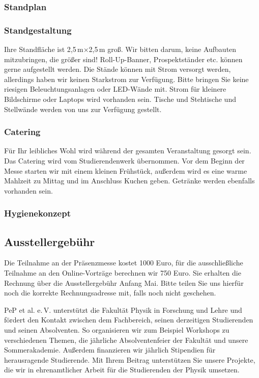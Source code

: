 \documentclass[
  paper=a4,
  fontsize=12pt,
  DIV=16,
  headheight=30pt,
  footheight=45pt,
  headinclude,
  parskip=half,
]{scrartcl}
\begin{document}
\subsubsection*{Standplan}
\subsubsection*{Standgestaltung}
Ihre Standfläche ist 2,5\,m$\times$2,5\,m groß.
Wir bitten darum, keine Aufbauten mitzubringen, die größer sind!
Roll-Up-Banner, Prospektständer etc. können gerne aufgestellt werden.
Die Stände können mit Strom versorgt werden, allerdings haben wir keinen Starkstrom zur Verfügung.
Bitte bringen Sie keine riesigen Beleuchtungsanlagen oder LED-Wände mit.
Strom für kleinere Bildschirme oder Laptops wird vorhanden sein.
Tische und Stehtische und Stellwände werden von uns zur Verfügung gestellt.

\subsubsection*{Catering}
Für Ihr leibliches Wohl wird während der gesamten Veranstaltung gesorgt sein.
Das Catering wird vom Studierendenwerk übernommen.
Vor dem Beginn der Messe starten wir mit einem kleinen Frühstück, außerdem wird es eine warme Mahlzeit zu Mittag und im Anschluss Kuchen geben.
Getränke werden ebenfalls vorhanden sein.

\subsubsection*{Hygienekonzept}


\subsection*{Ausstellergebühr}
Die Teilnahme an der Präsenzmesse kostet 1000 Euro, für die ausschließliche Teilnahme an den Online-Vorträge berechnen wir 750 Euro.
Sie erhalten die Rechnung über die Ausstellergebühr Anfang Mai.
Bitte teilen Sie uns hierfür noch die korrekte Rechnungsadresse mit, falls noch nicht geschehen.


PeP et al. e.\,V. unterstützt die Fakultät Physik in Forschung und Lehre und fördert den Kontakt zwischen dem Fachbereich, seinen derzeitigen Studierenden und seinen Absolventen.
So organisieren wir zum Beispiel Workshops zu verschiedenen Themen, die jährliche Absolventenfeier der Fakultät und unsere Sommerakademie.
Außerdem finanzieren wir jährlich Stipendien für herausragende Studierende.
Mit Ihrem Beitrag unterstützen Sie unsere Projekte, die wir in ehrenamtlicher Arbeit für die Studierenden der Physik umsetzen.
\end{document}
